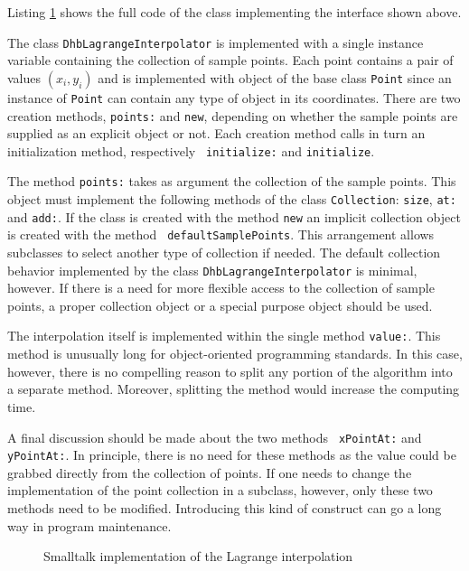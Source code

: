 \documentclass[twoside]{book}
\begin{document}
Listing \ref{ls:lagrange} shows the full code of the class
implementing the interface shown above.

The class {\tt DhbLagrangeInterpolator} is implemented with a
single instance variable containing the collection of sample
points. Each point contains a pair of values
$\left(x_i,y_i\right)$ and is implemented with object of the base
class {\tt Point} since an instance of {\tt Point} can contain any
type of object in its coordinates. There are two creation methods,
{\tt points:} and {\tt new}, depending on whether the sample
points are supplied as an explicit object or not. Each creation
method calls in turn an initialization method, respectively {\tt
initialize:} and {\tt initialize}.

The method {\tt points:} takes as argument the collection of the
sample points. This object must implement the following methods of
the class {\tt Collection}: {\tt size}, {\tt at:} and {\tt add:}.
If the class is created with the method {\tt new} an implicit
collection object is created with the method {\tt
defaultSamplePoints}. This arrangement allows subclasses to select
another type of collection if needed. The default collection
behavior implemented by the class {\tt DhbLagrangeInterpolator} is
minimal, however. If there is a need for more flexible access to
the collection of sample points, a proper collection object or a
special purpose object should be used.

The interpolation itself is implemented within the single method
{\tt value:}. This method is unusually long for object-oriented
programming standards. In this case, however, there is no
compelling reason to split any portion of the algorithm into a
separate method. Moreover, splitting the method would increase the
computing time.

A final discussion should be made about the two methods {\tt
xPointAt:} and {\tt yPointAt:}. In principle, there is no need for
these methods as the value could be grabbed directly from the
collection of points. If one needs to change the implementation of
the point collection in a subclass, however, only these two
methods need to be modified. Introducing this kind of construct
can go a long way in program maintenance.
\begin{figure}
\begin{listing}
\caption{Smalltalk implementation of the Lagrange
interpolation}
\label{ls:lagrange}

\end{listing}
\end{figure}
\end{document}
